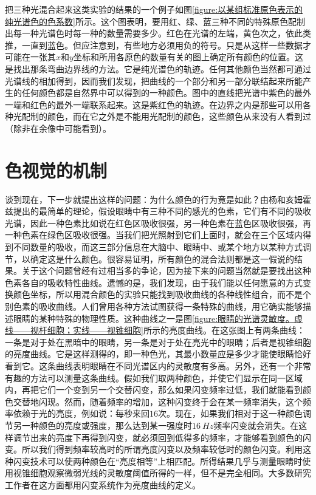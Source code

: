 把三种光混合起来这类实验的结果的一个例子如图\ref{figure:以某组标准原色表示的纯光谱色的色系数}所示。这个图表明，要用红、绿、蓝三种不同的特殊原色配制出每一种光谱色时每一种的数量需要多少。红色在光谱的左端，黄色次之，依此类推，一直到蓝色。但应注意到，有些地方必须用负的符号。只是从这样一些数据才可能在一张其$x$和$y$坐标和所用各原色的数量有关的图上确定所有颜色的位置。这是找出那条弯曲边界线的方法。它是纯光谱色的轨迹。任何其他颜色当然都可通过光谱线的相加得到，因而我们发现，把曲线的一个部分和另一部分联结起来所能产生的任何颜色都是自然界中可以得到的一种颜色。图中的直线把光谱中紫色的最外一端和红色的最外一端联系起来。这是紫红色的轨迹。在边界之内是那些可以用各种光配制的颜色，而在它之外是不能用光配制的颜色，这些颜色从来没有人看到过（除非在余像中可能看到）。

\section{色视觉的机制}

谈到现在，下一步就提出这样的问题：为什么颜色的行为竟是如此？由杨和亥姆霍兹提出的最简单的理论，假设眼睛中有三种不同的感光的色素，它们有不同的吸收光谱，因此一种色素比如说在红色区吸收很强，另一种色素在蓝色区吸收很强，再一种色素在绿色区吸收很强。当我们把光照射到它们上面时，就会在三个区域内得到不同数量的吸收，而这三部分信息在大脑中、眼睛中、或某个地方以某种方式调节，以确定这是什么颜色。很容易证明，所有颜色的混合法则都是这一假说的结果。关于这个问题曾经有过相当多的争论，因为接下来的问题当然就是要找出这种色素各自的吸收特性曲线。遗憾的是，我们发现，由于我们能以任何愿意的方式变换颜色坐标，所以用混合颜色的实验只能找到吸收曲线的各种线性组合，而不是个别色素的吸收曲线。人们曾用各种方法试图获得一条特殊的曲线，用它确实能够描述眼睛的某种特殊的物理性质。这种曲线之一是图\ref{figure:眼睛的光谱灵敏度。虚线——视杆细胞；实线——视锥细胞}所示的亮度曲线。在这张图上有两条曲线：一条是对于处在黑暗中的眼睛，另一条是对于处在亮光中的眼睛；后者是视锥细胞的亮度曲线。它是这样测得的，即一种色光，其最小数量应是多少才能使眼睛恰好看到它。这条曲线表明眼睛在不同光谱区内的灵敏度有多高。另外，还有一个非常有趣的方法可以测量这条曲线。假如我们取两种颜色，并使它们显示在同一区域内，再把它们一个变到另一个交替闪变，那么如果闪变频率过低，我们就能看到颜色交替地闪现。然而，随着频率的增加，这种闪变终于会在某一频率消失，这个频率依赖于光的亮度，例如说：每秒来回$16$次。现在，如果我们相对于这一种颜色调节另一种颜色的亮度或强度，那么达到某一强度时$16~Hz$频率闪变就会消失。在这样调节出来的亮度下再得到闪变，就必须回到低得多的频率，才能够看到颜色的闪变。所以我们得到频率较高时的所谓亮度闪变以及频率较低时的颜色闪变。利用这种闪变技术可以使两种颜色在“亮度相等”上相匹配。所得结果几乎与测量眼睛时使用视锥细胞观察微弱光线的灵敏度阈值所得的一样，但不是完全相同。大多数研究工作者在这方面都用闪变系统作为亮度曲线的定义。

